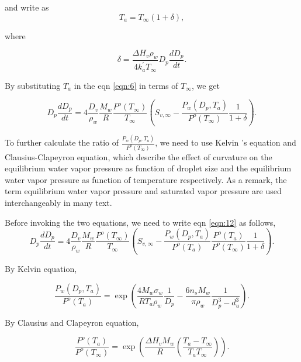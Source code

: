 \documentclass[12pt]{amsart}
\begin{document}
and write as 
\begin{equation}\label{eqn:10}
T_{a}=T_{\infty}(1+\delta),
\end{equation}

where 

\begin{equation}\label{eqn:11}
\delta= \frac{\Delta H_{v}  \rho_{w}}{4 k^{'}_{a}T_{\infty}} D_{p} \frac{dD_{p}}{dt}.
\end{equation}

By substituting $T_{a}$ in the eqn \ref{eqn:6} in terms of $T_{\infty}$, we get 


\begin{equation}\label{eqn:12}
D_{p}\frac{dD_{p}}{dt}=4 \frac{D_{v}} {\rho_{w}} \frac{M_{w}}{R} \frac{P^{o}(T_{\infty})} {T_{\infty}} (S_{v, \infty} - \frac{P_{w}(D_{p}, T_{a})}{P^{o}(T_{\infty})} \frac{1}{1+\delta}).
\end{equation}

To further calculate the ratio of $\frac{P_{w}(D_{p}, T_{a})}{P^{o}(T_{\infty})}$, we need to use Kelvin 's equation and Clausius-Clapeyron equation, which describe the effect of curvature on the equilibrium water vapor pressure as function of droplet size and the equilibrium water vapor pressure as function of temperature respectively. As a remark, the term equilibrium water vapor pressure and saturated vapor pressure are used interchangeably in many text.

Before invoking the two equations, we need to write eqn \ref{eqn:12} as follows,
\begin{equation}\label{eqn:SPgrowth}
D_{p}\frac{dD_{p}}{dt}=4 \frac{D_{v}} {\rho_{w}} \frac{M_{w}}{R} \frac{P^{o}(T_{\infty})} {T_{\infty}} (S_{v, \infty} - \frac{P_{w}(D_{p}, T_{a})}{P^{o}(T_{a})} \frac{P^{o}(T_{a})}{P^{o}(T_{\infty})}\frac{1}{1+\delta}).
\end{equation}

By Kelvin equation, 

\begin{equation}\label{eqn:kelvin}
\frac{P_{w}(D_{p}, T_{a})}{P^{o}(T_{a})}=\exp( \frac{4 M_{w}\sigma_{w}}{R T_{a} \rho_w}\frac{1}{D_{p}}-\frac{6 n_{s} M_{w}}{\pi \rho_{w}} \frac{1}{D_{p}^{3}-d_{u}^{3}}).
\end{equation}

By Clausius and Clapeyron equation,

\begin{equation}
\frac{P^{o}(T_{a})}{P^{o}(T_{\infty})}=\exp (\frac{\Delta H_{v} M_{w}}{R} (\frac{T_{a}-T_{\infty}}{T_{a} T_{\infty}})).
\end{equation}
\end{document}
